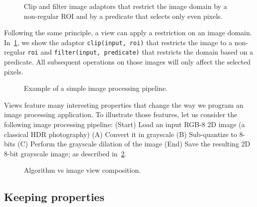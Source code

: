 \begin{figure}[tbh]
  

  
  \caption{Clip and filter image adaptors that restrict the image domain by a non-regular ROI and by a predicate that
    selects only even pixels.}
  \label{fig.view.clip}
\end{figure}

Following the same principle, a view can apply a restriction on an image domain. In~\cref{fig.view.clip}, we show the
adaptor \texttt{clip(input, roi)} that restricts the image to a non-regular \texttt{roi} and \texttt{filter(input,
  predicate)} that restricts the domain based on a predicate. All subsequent operations on those images will only affect
the selected pixels.

\begin{figure}[tbh]
  
  \caption{Example of a simple image processing pipeline.}
  \label{fig.view.pipeline}
\end{figure}

Views feature many interesting properties that change the way we program an image processing application. To illustrate
those features, let us consider the following image processing pipeline: (Start) Load an input RGB-8 2D image (a
classical HDR photography) (A) Convert it in grayscale (B) Sub-quantize to 8-bits (C) Perform the grayscale dilation of
the image (End) Save the resulting 2D 8-bit grayscale image; as described in~\cref{fig.view.pipeline}.


\begin{figure}[tbh]
  \begin{minipage}{\linewidth}
    
  \end{minipage}
  \caption{Algorithm vs image view composition.}
  \label{fig.view.comp}
\end{figure}

\subsection{Keeping properties}

